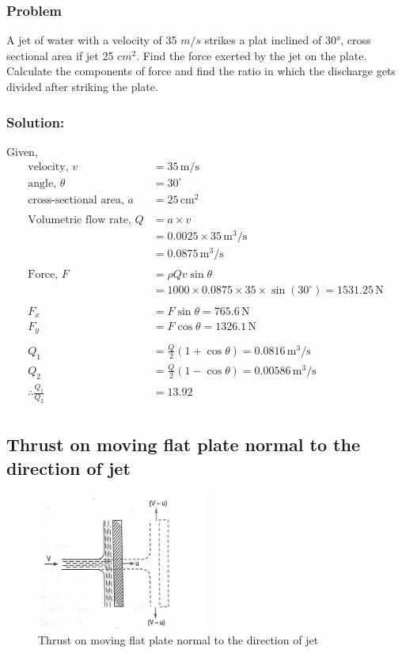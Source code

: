 \documentclass{article}
\begin{document}
\subsubsection*{Problem}
A jet of water with a velocity of 35 $m/s$ strikes a plat inclined of 30°, cross sectional area if jet 25 $cm^2$. Find the force exerted by the jet on the plate. Calculate the components of force and find the ratio in which the discharge gets divided after striking the plate. 

\subsubsection*{Solution:}
Given, 
\begin{align*}
  \text{velocity, } v &= 35 \, \text{m/s}\\
  \text{angle, } \theta &= 30^\circ \\
  \text{cross-sectional area, } a &= 25 \, \text{cm}^2 \\
  \\
  \text{Volumetric flow rate, } Q &= a \times v \\
  &= 0.0025 \times 35 \, \text{m}^3/\text{s} \\
  &= 0.0875 \, \text{m}^3/\text{s} \\ 
  \\
  \text{Force, } F &= \rho Q v \sin\theta \\
  &= 1000 \times 0.0875 \times 35 \times \sin(30^\circ) = 1531.25 \, \text{N} \\
  \\
  F_x &= F \sin\theta = 765.6 \, \text{N} \\
  F_y &= F \cos\theta = 1326.1 \, \text{N} \\
  \\
  Q_1 &= \frac{Q}{2} (1 + \cos\theta) = 0.0816 \, \text{m}^3/\text{s}\\
  Q_2 &= \frac{Q}{2} (1 - \cos\theta) = 0.00586 \, \text{m}^3/\text{s}\\
  \therefore \frac{Q_1}{Q_2} &= 13.92\\
\end{align*} 

\subsection{Thrust on moving flat plate normal to the direction of jet}
\begin{figure}[H]
  \centering
  \includegraphics[width=0.5\textwidth]{img/Thrust_on_moving_flat_plate_normal_to_the_direction_of_jet.jpg}
  \caption{Thrust on moving flat plate normal to the direction of jet}
  \label{fig:Thrust_on_moving_flat_plate}
\end{figure}
\end{document}
